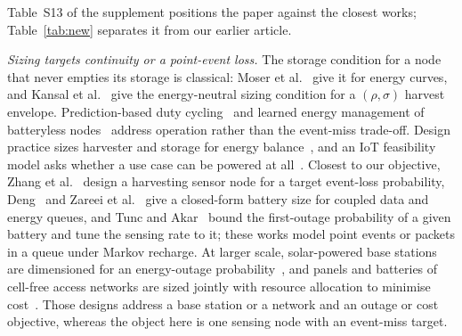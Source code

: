 Table~S13 of the supplement positions the paper against the closest works; Table~\ref{tab:new} separates it from our earlier article.

\emph{Sizing targets continuity or a point-event loss.} The storage condition for a node that never empties its storage is classical: Moser et al.~\cite{moser2007rts} give it for energy curves, and Kansal et al.~\cite{kansal2007} give the energy-neutral sizing condition for a $(\rho,\sigma)$ harvest envelope. Prediction-based duty cycling~\cite{buchli2014sensys} and learned energy management of batteryless nodes~\cite{ahn2023iotj} address operation rather than the event-miss trade-off. Design practice sizes harvester and storage for energy balance~\cite{kuaban2025iwcmc}, and an IoT feasibility model asks whether a use case can be powered at all~\cite{vanleemput2023iotj}. Closest to our objective, Zhang et al.~\cite{zhang2013twc} design a harvesting sensor node for a target event-loss probability, Deng~\cite{deng2022arxiv} and Zareei et al.~\cite{zareei2017pimrc} give a closed-form battery size for coupled data and energy queues, and Tunc and Akar~\cite{tunc2017peva} bound the first-outage probability of a given battery and tune the sensing rate to it; these works model point events or packets in a queue under Markov recharge. At larger scale, solar-powered base stations are dimensioned for an energy-outage probability~\cite{naderi2025tgcn}, and panels and batteries of cell-free access networks are sized jointly with resource allocation to minimise cost~\cite{chen2026tgcn}. Those designs address a base station or a network and an outage or cost objective, whereas the object here is one sensing node with an event-miss target.

